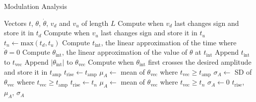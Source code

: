\begin{algorithm}
    \caption{Modulation Analysis}
    \begin{algorithmic}[1]
        \Require Vectors $t$, $\theta$, $\dot{\theta}$, $v_d$ and $v_u$ of length $L$
        \State Compute when $v_d$ last changes sign and store it in $t_d$
        \State Compute when $v_u$ last changes sign and store it in $t_u$
        \State $t_n \gets \text{max}\left(t_d, t_u\right)$ 
         
            \State Compute $t_\text{int}$, the linear approximation of the time where $\dot{\theta} = 0$
            \State Compute $\theta_\text{int}$, the linear approximation of the value of $\theta$ at $t_\text{int}$
            \State Append $t_\text{int}$ to $t_\text{vec}$
            \State Append $\left|\theta_\text{int}\right|$ to $\theta_\text{vec}$
            \EndIf
        \EndFor
        \State Compute when $\theta_\text{int}$ first crosses the desired amplitude and store it in $t_\text{amp}$
         
            \State $t_\text{rise} \gets t_\text{amp}$
            \State $\mu_A \gets$ mean of $\theta_\text{vec}$ where $t_\text{vec} \ge t_\text{amp}$ 
            \State $\sigma_A \gets$ SD of $\theta_\text{vec}$ where $t_\text{vec} \ge t_\text{amp}$ 
        \Else {}
            \State $t_\text{rise} \gets t_n$
            \State $\mu_A \gets$ mean of $\theta_\text{vec}$ where $t_\text{vec} \ge t_n$ 
            \State $\sigma_A \gets 0$
        \EndIf
        \State \Return$t_\text{rise}$, $\mu_A$, $\sigma_A$ 
    \end{algorithmic}
    \label{alg:modulation}
\end{algorithm}
 
